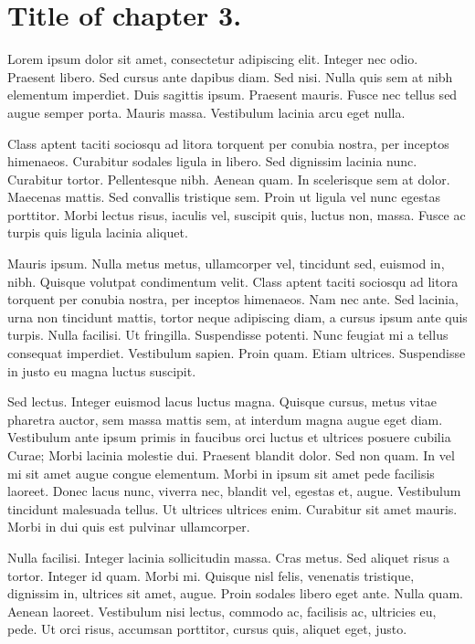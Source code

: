 \chapter{Title of chapter 3.}

Lorem ipsum dolor sit amet, consectetur adipiscing elit. Integer nec
odio. Praesent libero. Sed cursus ante dapibus diam. Sed nisi. Nulla
quis sem at nibh elementum imperdiet. Duis sagittis ipsum. Praesent
mauris. Fusce nec tellus sed augue semper porta. Mauris massa.
Vestibulum lacinia arcu eget nulla.

Class aptent taciti sociosqu ad litora torquent per conubia nostra, per
inceptos himenaeos. Curabitur sodales ligula in libero. Sed dignissim
lacinia nunc. Curabitur tortor. Pellentesque nibh. Aenean quam. In
scelerisque sem at dolor. Maecenas mattis. Sed convallis tristique sem.
Proin ut ligula vel nunc egestas porttitor. Morbi lectus risus, iaculis
vel, suscipit quis, luctus non, massa. Fusce ac turpis quis ligula
lacinia aliquet.

Mauris ipsum. Nulla metus metus, ullamcorper vel, tincidunt sed, euismod
in, nibh. Quisque volutpat condimentum velit. Class aptent taciti
sociosqu ad litora torquent per conubia nostra, per inceptos himenaeos.
Nam nec ante. Sed lacinia, urna non tincidunt mattis, tortor neque
adipiscing diam, a cursus ipsum ante quis turpis. Nulla facilisi. Ut
fringilla. Suspendisse potenti. Nunc feugiat mi a tellus consequat
imperdiet. Vestibulum sapien. Proin quam. Etiam ultrices. Suspendisse in
justo eu magna luctus suscipit.

Sed lectus. Integer euismod lacus luctus magna. Quisque cursus, metus
vitae pharetra auctor, sem massa mattis sem, at interdum magna augue
eget diam. Vestibulum ante ipsum primis in faucibus orci luctus et
ultrices posuere cubilia Curae; Morbi lacinia molestie dui. Praesent
blandit dolor. Sed non quam. In vel mi sit amet augue congue elementum.
Morbi in ipsum sit amet pede facilisis laoreet. Donec lacus nunc,
viverra nec, blandit vel, egestas et, augue. Vestibulum tincidunt
malesuada tellus. Ut ultrices ultrices enim. Curabitur sit amet mauris.
Morbi in dui quis est pulvinar ullamcorper.

Nulla facilisi. Integer lacinia sollicitudin massa. Cras metus. Sed
aliquet risus a tortor. Integer id quam. Morbi mi. Quisque nisl felis,
venenatis tristique, dignissim in, ultrices sit amet, augue. Proin
sodales libero eget ante. Nulla quam. Aenean laoreet. Vestibulum nisi
lectus, commodo ac, facilisis ac, ultricies eu, pede. Ut orci risus,
accumsan porttitor, cursus quis, aliquet eget, justo.

